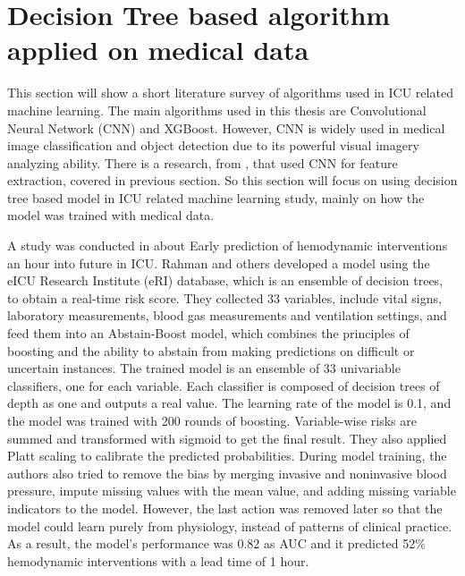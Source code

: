 \documentclass[12pt,a4paper,english
]{tunithesis}
\begin{document}
\section{Decision Tree based algorithm applied on medical data}
This section will show a short literature survey of algorithms used in ICU related machine learning. The main algorithms used in this thesis are Convolutional Neural Network (CNN) and XGBoost. However, CNN is widely used in medical image classification and object detection due to its powerful visual imagery analyzing ability. There is a research, from \textcite{asuroglu2021}, that used CNN for feature extraction, covered in previous section. So this section will focus on using decision tree based model in ICU related machine learning study, mainly on how the model was trained with medical data.

A study was conducted in \textcite{rahman2021} about Early prediction of hemodynamic interventions an hour into future in ICU. Rahman and others developed a model using the eICU Research Institute (eRI) database, which is an ensemble of decision trees, to obtain a real-time risk score. They collected 33 variables, include vital signs, laboratory measurements, blood gas measurements and ventilation settings, and feed them into an Abstain-Boost model, which combines the principles of boosting and the ability to abstain from making predictions on difficult or uncertain instances. The trained model is an ensemble of 33 univariable classifiers, one for each variable. Each classifier is composed of decision trees of depth as one and outputs a real value. The learning rate of the model is 0.1, and the model was trained with 200 rounds of boosting. Variable-wise risks are summed and transformed with sigmoid to get the final result. They also applied Platt scaling to calibrate the predicted probabilities. During model training, the authors also tried to remove the bias by merging invasive and noninvasive blood pressure, impute missing values with the mean value, and adding missing variable indicators to the model. However, the last action was removed later so that the model could learn purely from physiology, instead of patterns of clinical practice. As a result, the model's performance was 0.82 as AUC and it predicted 52\% hemodynamic interventions with a lead time of 1 hour.
\end{document}
